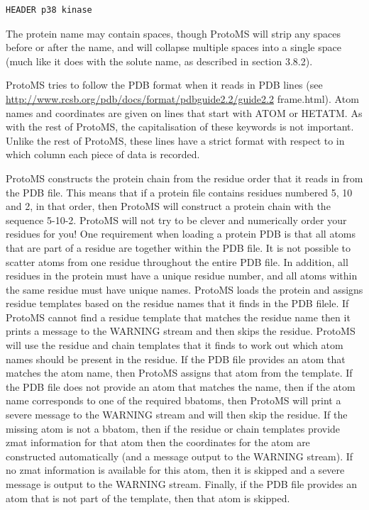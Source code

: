\documentclass[letterpaper,10pt,english]{sphinxmanual}
\begin{document}
\begin{Verbatim}[commandchars=\\\{\}]
HEADER p38 kinase
\end{Verbatim}

The protein name may contain spaces, though ProtoMS will strip any spaces before or after the name, and will collapse multiple spaces into a single space (much like it does with the solute name, as described in section 3.8.2).

ProtoMS tries to follow the PDB format when it reads in PDB lines (see \href{http://www.rcsb.org/pdb/docs/format/pdbguide2.2/guide2.2}{http://www.rcsb.org/pdb/docs/format/pdbguide2.2/guide2.2} frame.html). Atom names and coordinates are given on lines that start with ATOM or HETATM. As with the rest of ProtoMS, the capitalisation of these keywords is not important. Unlike the rest of ProtoMS, these lines have a strict format with respect to in which column each piece of data is recorded.

ProtoMS constructs the protein chain from the residue order that it reads in from the PDB file. This means that if a protein file contains residues numbered 5, 10 and 2, in that order, then ProtoMS will construct a protein chain with the sequence 5-10-2. ProtoMS will not try to be clever and numerically order your residues for you! One requirement when loading a protein PDB is that all atoms that are part of a residue are together within the PDB file. It is not possible to scatter atoms from one residue throughout the entire PDB file. In addition, all residues in the protein must have a unique residue number, and all atoms within the same residue must have unique names. ProtoMS loads the protein and assigns residue templates based on the residue names that it finds in the PDB filele. If ProtoMS cannot find a residue template that matches the residue name then it prints a message to the WARNING stream and then skips the residue. ProtoMS will use the residue and chain templates that it finds to work out which atom names should be present in the residue. If the PDB file provides an atom that matches the atom name, then ProtoMS assigns that atom from the template. If the PDB file does not provide an atom that matches the name, then if the atom name corresponds to one of the required bbatoms, then ProtoMS will print a severe message to the WARNING stream and will then skip the residue. If the missing atom is not a bbatom, then if the residue or chain templates provide zmat information for that atom then the coordinates for the atom are constructed automatically (and a message output to the WARNING stream). If no zmat information is available for this atom, then it is skipped and a severe message is output to the WARNING stream. Finally, if the PDB file provides an atom that is not part of the template, then that atom is skipped.
\end{document}
